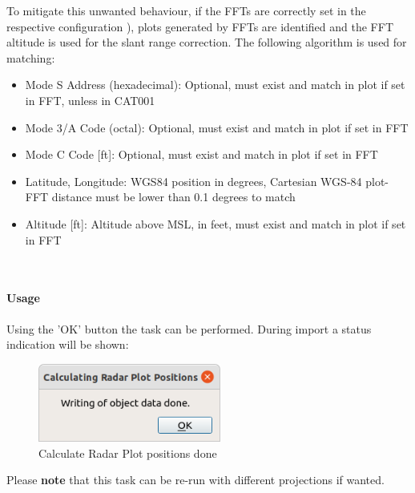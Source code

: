 To mitigate this unwanted behaviour, if the FFTs are correctly set in the respective configuration ), plots generated by FFTs are identified and the FFT altitude is used for the slant range correction. The following algorithm is used for matching:

\begin{itemize}
\item Mode S Address (hexadecimal): Optional, must exist and match in plot if set in FFT, unless in CAT001
\item Mode 3/A Code (octal): Optional, must exist and match in plot if set in FFT
\item Mode C Code [ft]: Optional, must exist and match in plot if set in FFT
\item Latitude, Longitude: WGS84 position in degrees, Cartesian WGS-84 plot-FFT distance must be lower than 0.1 degrees to match
\item Altitude [ft]: Altitude above MSL, in feet, must exist and match in plot if set in FFT
\end{itemize}
\ \\

\paragraph{Usage}

Using the 'OK' button the task can be performed. During import a status indication will be shown:

\begin{figure}[H]
  \center
    \includegraphics[width=6cm]{figures/proc_calc_radar_done.png}
  \caption{Calculate Radar Plot positions done}
\end{figure}

Please \textbf{note} that this task can be re-run with different projections if wanted.

